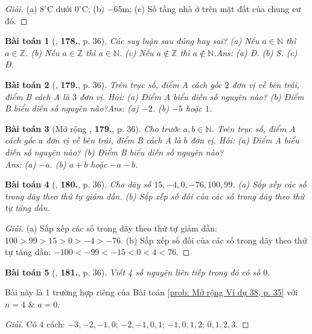\documentclass{article}
\numberwithin{equation}{section}
\newtheorem{baitoan}{Bài toán}
\begin{document}
\begin{proof}[Giải]
	(a) $8^\circ$C dưới $0^\circ$C; (b) $-65$m; (c) Số tầng nhà ở trên mặt đất của chung cư đó.
\end{proof}

\begin{baitoan}[\cite{Tuyen_Toan_6}, \textbf{178.}, p. 36]
	Các suy luận sau đúng hay sai? (a) Nếu $a\in\mathbb{N}$ thì $a\in\mathbb{Z}$. (b) Nếu $a\in\mathbb{Z}$ thì $a\in\mathbb{N}$. (c) Nếu $a\notin\mathbb{Z}$ thì $a\notin\mathbb{N}$.\hfill{\sf Ans:} (a) Đ. (b) S. (c) Đ.
\end{baitoan}

\begin{baitoan}[\cite{Tuyen_Toan_6}, \textbf{179.}, p. 36]
	Trên trục số, điểm A cách gốc $2$ đơn vị về bên trái, điểm B cách A là $3$ đơn vị. Hỏi: (a) Điểm A biểu diễn số nguyên nào? (b) Điểm B biểu diễn số nguyên nào?\hfill{\sf Ans:} (a) $-2$. (b) $-5$ hoặc $1$.
\end{baitoan}

\begin{baitoan}[Mở rộng \cite{Tuyen_Toan_6}, \textbf{179.}, p. 36]
	Cho trước $a,b\in\mathbb{N}$. Trên trục số, điểm A cách gốc $a$ đơn vị về bên trái, điểm B cách A là $b$ đơn vị. Hỏi: (a) Điểm A biểu diễn số nguyên nào? (b) Điểm B biểu diễn số nguyên nào?\\\mbox{}\hfill{\sf Ans:} (a) $-a$. (b) $a + b$ hoặc $-a - b$.
\end{baitoan}

\begin{baitoan}[\cite{Tuyen_Toan_6}, \textbf{180.}, p. 36]
	Cho dãy số $15,-4,0,-76,100,99$. (a) Sắp xếp các số trong dãy theo thứ tự giảm dần. (b) Sắp xếp số đối của các số trong dãy theo thứ tự tăng dần.
\end{baitoan}

\begin{proof}[Giải]
	(a) Sắp xếp các số trong dãy theo thứ tự giảm dần: $100 > 99 > 15 > 0 > -4 > -76$. (b) Sắp xếp số đối của các số trong dãy theo thứ tự tăng dần: $-100 < -99 < -15 < 0 < 4 < 76$.
\end{proof}

\begin{baitoan}[\cite{Tuyen_Toan_6}, \textbf{181.}, p. 36]
	Viết 4 số nguyên liên tiếp trong đó có số $0$.
\end{baitoan}
Bài này là 1 trường hợp riêng của Bài toán \ref{prob: Mở rộng Ví dụ 38, p. 35} với $n = 4$ \& $a = 0$.

\begin{proof}[Giải]
	Có 4 cách: $-3,-2,-1,0$; $-2,-1,0,1$; $-1,0,1,2$; $0,1,2,3$.
\end{proof}
\end{document}
